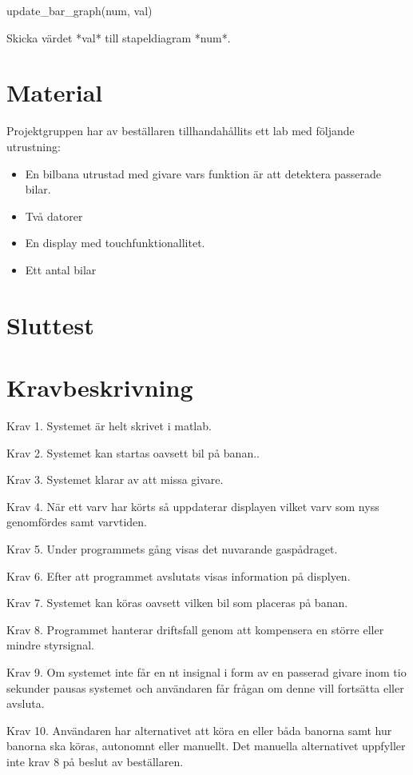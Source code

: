 \documentclass[10pt,oneside,swedish]{lips-no_customer}
\begin{document}
update\_bar\_graph(num, val)

Skicka värdet *val* till stapeldiagram *num*.

\section{Material}

Projektgruppen har av beställaren tillhandahållits ett lab med följande utrustning:

\begin{itemize}
	\item En bilbana utrustad med givare vars funktion är att detektera passerade bilar.
	\item Två datorer
	\item En display med touchfunktionallitet. 
	\item Ett antal bilar 
\end{itemize}

\section{Sluttest}

\section{Kravbeskrivning}

Krav 1. Systemet är helt skrivet i matlab.

Krav 2. Systemet kan startas oavsett bil på banan.. 

Krav 3. Systemet klarar av att missa givare. 

Krav 4. När ett varv har körts så uppdaterar displayen vilket varv som nyss
genomfördes samt varvtiden. 

Krav 5. Under programmets gång visas det nuvarande gaspådraget. 

Krav 6. Efter att programmet avslutats visas information på displyen.

Krav 7. Systemet kan köras oavsett vilken bil som placeras på banan. 

Krav 8. Programmet hanterar driftsfall genom att kompensera en större eller
mindre styrsignal. 

Krav 9. Om systemet inte får en nt insignal i form av en passerad givare inom
tio sekunder pausas systemet och användaren får frågan om denne vill fortsätta
eller avsluta. 

Krav 10. Användaren har alternativet att köra en eller båda banorna samt hur
banorna ska köras, autonomnt eller manuellt. Det manuella alternativet uppfyller
inte krav 8 på beslut av beställaren. 
\end{document}
